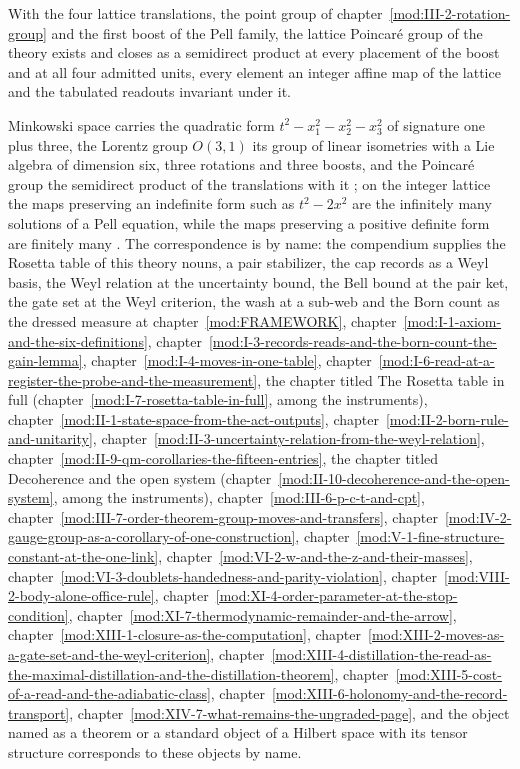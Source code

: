 With the four lattice translations, the point group of chapter~\ref{mod:III-2-rotation-group} and the first boost of the Pell family, the lattice Poincar\'e group of the theory exists and closes as a semidirect product at every placement of the boost and at all four admitted units, every element an integer affine map of the lattice and the tabulated readouts invariant under it.
\begin{chbridge}
Minkowski space carries the quadratic form $t^2 - x_1^2 - x_2^2 - x_3^2$ of signature one plus three, the Lorentz group $O(3,1)$ its group of linear isometries with a Lie algebra of dimension six, three rotations and three boosts, and the Poincar\'e group the semidirect product of the translations with it \cite{Minkowski1908,Weinberg1995}; on the integer lattice the maps preserving an indefinite form such as $t^2 - 2x^2$ are the infinitely many solutions of a Pell equation, while the maps preserving a positive definite form are finitely many \cite{HardyWright1979}. The correspondence is by name: the compendium supplies the Rosetta table of this theory nouns, a pair stabilizer, the cap records as a Weyl basis, the Weyl relation at the uncertainty bound, the Bell bound at the pair ket, the gate set at the Weyl criterion, the wash at a sub-web and the Born count as the dressed measure at chapter~\ref{mod:FRAMEWORK}, chapter~\ref{mod:I-1-axiom-and-the-six-definitions}, chapter~\ref{mod:I-3-records-reads-and-the-born-count-the-gain-lemma}, chapter~\ref{mod:I-4-moves-in-one-table}, chapter~\ref{mod:I-6-read-at-a-register-the-probe-and-the-measurement}, the chapter titled The Rosetta table in full (chapter~\ref{mod:I-7-rosetta-table-in-full}, among the instruments), chapter~\ref{mod:II-1-state-space-from-the-act-outputs}, chapter~\ref{mod:II-2-born-rule-and-unitarity}, chapter~\ref{mod:II-3-uncertainty-relation-from-the-weyl-relation}, chapter~\ref{mod:II-9-qm-corollaries-the-fifteen-entries}, the chapter titled Decoherence and the open system (chapter~\ref{mod:II-10-decoherence-and-the-open-system}, among the instruments), chapter~\ref{mod:III-6-p-c-t-and-cpt}, chapter~\ref{mod:III-7-order-theorem-group-moves-and-transfers}, chapter~\ref{mod:IV-2-gauge-group-as-a-corollary-of-one-construction}, chapter~\ref{mod:V-1-fine-structure-constant-at-the-one-link}, chapter~\ref{mod:VI-2-w-and-the-z-and-their-masses}, chapter~\ref{mod:VI-3-doublets-handedness-and-parity-violation}, chapter~\ref{mod:VIII-2-body-alone-office-rule}, chapter~\ref{mod:XI-4-order-parameter-at-the-stop-condition}, chapter~\ref{mod:XI-7-thermodynamic-remainder-and-the-arrow}, chapter~\ref{mod:XIII-1-closure-as-the-computation}, chapter~\ref{mod:XIII-2-moves-as-a-gate-set-and-the-weyl-criterion}, chapter~\ref{mod:XIII-4-distillation-the-read-as-the-maximal-distillation-and-the-distillation-theorem}, chapter~\ref{mod:XIII-5-cost-of-a-read-and-the-adiabatic-class}, chapter~\ref{mod:XIII-6-holonomy-and-the-record-transport}, chapter~\ref{mod:XIV-7-what-remains-the-ungraded-page}, and the object named as a theorem or a standard object of a Hilbert space with its tensor structure corresponds to these objects by name.
\end{chbridge}
